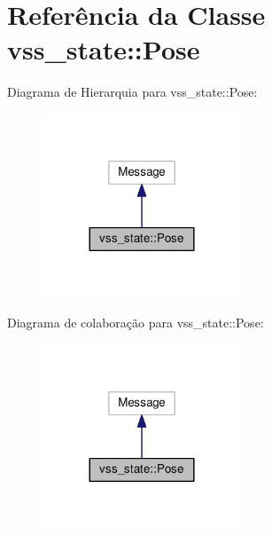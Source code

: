 \hypertarget{classvss__state_1_1Pose}{}\section{Referência da Classe vss\+\_\+state\+:\+:Pose}
\label{classvss__state_1_1Pose}


Diagrama de Hierarquia para vss\+\_\+state\+:\+:Pose\+:\nopagebreak
\begin{figure}[H]
\begin{center}
\leavevmode
\includegraphics[width=168pt]{classvss__state_1_1Pose__inherit__graph}
\end{center}
\end{figure}


Diagrama de colaboração para vss\+\_\+state\+:\+:Pose\+:\nopagebreak
\begin{figure}[H]
\begin{center}
\leavevmode
\includegraphics[width=168pt]{classvss__state_1_1Pose__coll__graph}
\end{center}
\end{figure}
